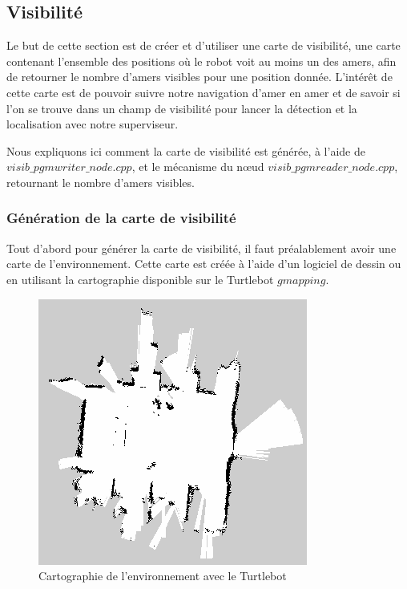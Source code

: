 \documentclass[10pt,a4paper]{article}
\begin{document}
\subsection{Visibilité}
\label{sec:visibilite}

Le but de cette section est de créer et d'utiliser une carte de visibilité, une carte contenant l'ensemble des positions où le robot voit au moins un des amers, afin de retourner le nombre d'amers visibles pour une position donnée. L’intérêt de cette carte est de pouvoir suivre notre navigation d'amer en amer et de savoir si l'on se trouve dans un champ de visibilité pour lancer la détection et la localisation avec notre superviseur.

Nous expliquons ici comment la carte de visibilité est générée, à l'aide de $visib\_pgmwriter\_node.cpp$, et le mécanisme du nœud $visib\_pgmreader\_node.cpp$, retournant le nombre d'amers visibles.

\subsubsection{Génération de la carte de visibilité}
Tout d'abord pour générer la carte de visibilité, il faut préalablement avoir une carte de l'environnement. Cette carte est créée à l'aide d'un logiciel de dessin ou en utilisant la cartographie disponible sur le Turtlebot $gmapping$.

\begin{figure}[!h]
\center
\includegraphics[scale=0.6]{figures/aip_map.png} 
\caption{Cartographie de l'environnement avec le Turtlebot}	
\end{figure}
\end{document}
